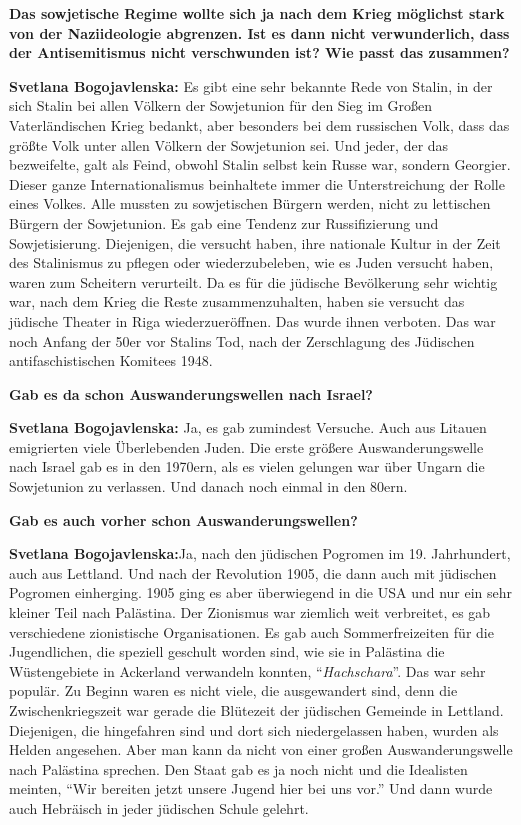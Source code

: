\textbf{Das sowjetische Regime wollte sich ja nach dem Krieg möglichst stark von der Naziideologie abgrenzen. Ist es dann nicht verwunderlich, dass der Antisemitismus nicht verschwunden ist? Wie passt das zusammen?}

\textbf{Svetlana Bogojavlenska:} Es gibt eine sehr bekannte Rede von Stalin, in der sich Stalin bei allen Völkern der Sowjetunion für den Sieg im Großen Vaterländischen Krieg bedankt, aber besonders bei dem russischen Volk, dass das größte Volk unter allen Völkern der Sowjetunion sei. Und jeder, der das bezweifelte, galt als Feind, obwohl Stalin selbst kein Russe war, sondern Georgier. Dieser ganze Internationalismus beinhaltete immer die Unterstreichung der Rolle eines Volkes. Alle mussten zu sowjetischen Bürgern werden, nicht zu lettischen Bürgern der Sowjetunion. Es gab eine Tendenz zur Russifizierung und Sowjetisierung. Diejenigen, die versucht haben, ihre nationale Kultur in der Zeit des Stalinismus zu pflegen oder wiederzubeleben, wie es Juden versucht haben, waren zum Scheitern verurteilt. Da es für die jüdische Bevölkerung sehr wichtig war, nach dem Krieg die Reste zusammenzuhalten, haben sie versucht das jüdische Theater in Riga wiederzueröffnen. Das wurde ihnen verboten. 
Das war noch Anfang der 50er vor Stalins Tod, nach der Zerschlagung des Jüdischen antifaschistischen Komitees 1948.

\textbf{Gab es da schon Auswanderungswellen nach Israel?}

\textbf{Svetlana Bogojavlenska:} Ja, es gab zumindest Versuche. Auch aus Litauen emigrierten viele Überlebenden Juden. Die erste größere Auswanderungswelle nach Israel gab es in den 1970ern, als es vielen gelungen war über Ungarn die Sowjetunion zu verlassen. Und danach noch einmal in den 80ern. 

\textbf{Gab es auch vorher schon Auswanderungswellen?}

\textbf{Svetlana Bogojavlenska:}Ja, nach den jüdischen Pogromen im 19. Jahrhundert, auch aus Lettland. Und nach der Revolution 1905, die dann auch mit jüdischen Pogromen einherging. 1905 ging es aber überwiegend in die USA und nur ein sehr kleiner Teil nach Palästina. Der Zionismus war ziemlich weit verbreitet, es gab verschiedene zionistische Organisationen. Es gab auch Sommerfreizeiten für die Jugendlichen, die speziell geschult worden sind, wie sie in Palästina die Wüstengebiete in Ackerland verwandeln konnten, "`\textit{Hachschara}"'. Das war sehr populär. Zu Beginn waren es nicht viele, die ausgewandert sind, denn die Zwischenkriegszeit war gerade die Blütezeit der jüdischen Gemeinde in Lettland. Diejenigen, die hingefahren sind und dort sich niedergelassen haben, wurden als Helden angesehen. Aber man kann da nicht von einer großen Auswanderungswelle nach Palästina sprechen. Den Staat gab es ja noch nicht und die Idealisten meinten, "`Wir bereiten jetzt unsere Jugend hier bei uns vor."' Und dann wurde auch Hebräisch in jeder jüdischen Schule gelehrt.

